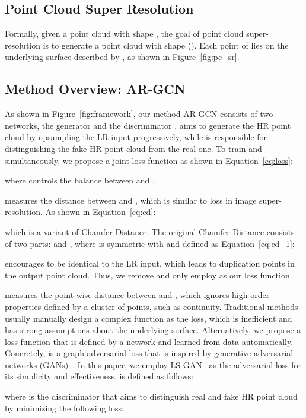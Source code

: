 \documentclass[10pt,twocolumn,letterpaper]{article}
\begin{document}
\subsection{Point Cloud Super Resolution}
Formally, given a point cloud  with shape , the goal of point cloud super-resolution is to generate a point cloud  with shape  ().
Each point of  lies on the underlying surface described by , as shown in Figure~\ref{fig:pc_sr}.

\subsection{Method Overview: AR-GCN}
As shown in Figure~\ref{fig:framework}, our method AR-GCN consists of two networks, the generator  and the discriminator .
 aims to generate the HR point cloud by upsampling the LR input progressively, while  is responsible for distinguishing the fake HR point cloud from the real one.
To train  and  simultaneously, we propose a joint loss function as shown in Equation~\ref{eq:loss}:

where  controls the balance between  and .

 measures the distance between  and , which is similar to  loss in image super-resolution.
As shown in Equation~\ref{eq:cd}:

which is a variant of Chamfer Distance.
The original Chamfer Distance consists of two parts:  and , where  is symmetric with  and defined as Equation~\ref{eq:cd_1}:

 encourages  to be identical to the LR input, which leads to duplication points in the output point cloud.
Thus, we remove  and only employ  as our loss function.

 measures the point-wise distance between  and , which ignores high-order properties defined by a cluster of points, such as continuity.
Traditional methods usually manually design a complex function as the loss, which is inefficient and has strong assumptions about the underlying surface.
Alternatively, we propose a loss function  that is defined by a network and learned from data automatically.
Concretely,  is a graph adversarial loss that is inspired by generative adversarial networks (GANs)~\cite{goodfellow2014generative}.
In this paper, we employ LS-GAN~\cite{mao2017least} as the adversarial loss for its simplicity and effectiveness.
 is defined as follows:

where  is the discriminator that aims to distinguish real and fake HR point cloud by minimizing the following loss:
\end{document}
